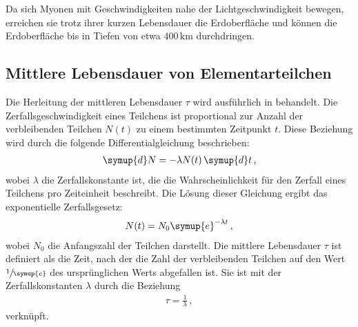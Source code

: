 Da sich Myonen mit Geschwindigkeiten nahe der Lichtgeschwindigkeit bewegen, erreichen sie trotz ihrer kurzen Lebensdauer die Erdoberfläche 
und können die Erdoberfläche bis in Tiefen von etwa $400\,\unit{\kilo\meter}$ durchdringen.

\subsection{Mittlere Lebensdauer von Elementarteilchen}
Die Herleitung der mittleren Lebensdauer $\tau$ wird ausführlich in \cite{Techniques} behandelt. Die Zerfallsgeschwindigkeit eines Teilchens 
ist proportional zur Anzahl der verbleibenden Teilchen $N(t)$ zu einem bestimmten Zeitpunkt $t$. Diese Beziehung wird durch die folgende 
Differentialgleichung beschrieben:
\begin{align}
\symup{d}N = -\lambda N(t)\,\symup{d}t \,, %
\end{align}
wobei $\lambda$ die Zerfallskonstante ist, die die Wahrscheinlichkeit für den Zerfall eines Teilchens pro Zeiteinheit beschreibt. 
Die Lösung dieser Gleichung ergibt das exponentielle Zerfallsgesetz:
\begin{align}
N(t) = N_0 \symup{e}^{-\lambda t} \,, \label{eqn:Zerfallsgesetz}
\end{align}
wobei $N_0$ die Anfangszahl der Teilchen darstellt. Die mittlere Lebensdauer $\tau$ ist definiert als die Zeit, nach der die Zahl der 
verbleibenden Teilchen auf den Wert $\sfrac{1}{\symup{e}}$ des ursprünglichen Werts abgefallen ist. Sie ist mit der Zerfallskonstanten $\lambda$ durch die Beziehung
\begin{align}
\tau = \frac{1}{\lambda}\,, \label{eqn:tau}
\end{align}
verknüpft.



%
%



